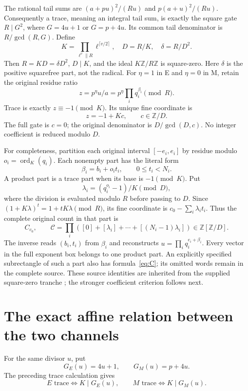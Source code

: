 The rational tail sums are $(a+pu)^2/(Ru)$ and $p(a+u)^2/(Ru)$.
Consequently a trace, meaning an integral tail sum, is exactly the square gate
$R\mid G^2$, where $G=4u+1$ or $G=p+4u$. Its common tail denominator is
$R/\gcd(R,G)$. Define
\[
 K=\prod_{\ell^v\parallel R}\ell^{\lceil v/2\rceil},\quad
 D=R/K,\quad\delta=R/D^2.
\]
Then $R=KD=\delta D^2$, $D\mid K$, and the ideal $K\mathbb Z/R\mathbb Z$
is square-zero. Here $\delta$ is the positive squarefree part, not the radical.
For $\eta=1$ in E and $\eta=0$ in M, retain the original residue ratio
\[
 z=p^\eta u/a=p^\eta\prod_iq_i^{\beta_i}\pmod R.
\]
Trace is exactly $z\equiv-1\pmod K$. Its unique fine coordinate is
\begin{equation}\label{eq:defect}
 z=-1+Kc,\qquad c\in\mathbb Z/D.
\end{equation}
The full gate is $c=0$; the original denominator is $D/\gcd(D,c)$.
No integer coefficient is reduced modulo $D$.

For completeness, partition each original interval $[-e_i,e_i]$ by residue
modulo $o_i=\operatorname{ord}_K(q_i)$. Each nonempty part has the literal form
\[
 \beta_i=b_i+o_it_i,\qquad0\le t_i<N_i.
\]
A product part is a trace part when its base is $-1\pmod K$. Put
\[
 \lambda_i=(q_i^{o_i}-1)/K\pmod D,
\]
where the division is evaluated modulo $R$ before passing to $D$. Since
$(1+K\lambda)^t=1+tK\lambda\pmod R$, its fine coordinate is
$c_0-\sum_i\lambda_it_i$. Thus the complete original count in that part is
\begin{equation}\label{eq:C}
 C_{c_0},\qquad
 \mathcal C=\prod_i\left([0]+[\lambda_i]+\cdots+[(N_i-1)\lambda_i]\right)
 \in\mathbb Z[\mathbb Z/D].
\end{equation}
The inverse reads $(b_i,t_i)$ from $\beta_i$ and reconstructs
$u=\prod_iq_i^{e_i+\beta_i}$. Every vector in the full exponent box belongs to
one product part. An explicitly specified subrectangle of such a part also
has formula~\eqref{eq:C}; its omitted words remain in the complete source.
These source identities are inherited from the supplied square-zero tranche
\citep[\S\S2--4]{Previous}; the stronger coefficient criterion follows next.

\section{The exact affine relation between the two channels}
For the same divisor $u$, put
\[
 G_E(u)=4u+1,\qquad G_M(u)=p+4u.
\]
The preceding trace calculation gives
\[
 E\text{ trace}\Longleftrightarrow K\mid G_E(u),\qquad
 M\text{ trace}\Longleftrightarrow K\mid G_M(u).
\]

